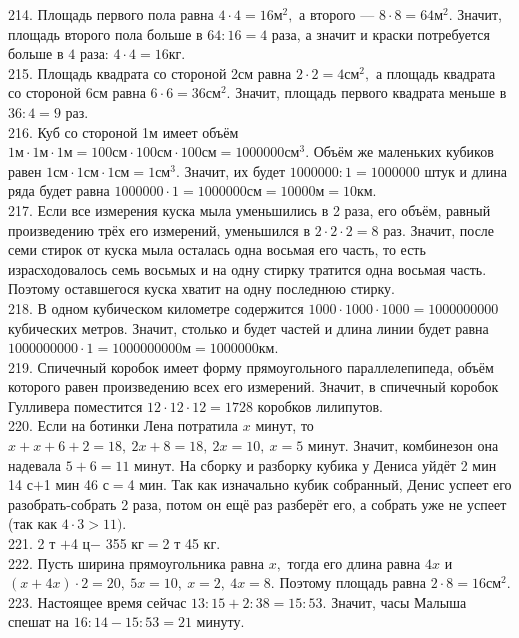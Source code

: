 \documentclass[12pt]{article}
\begin{document}
214. Площадь первого пола равна $4\cdot4=16\text{м}^2,$ а второго --- $8\cdot8=64\text{м}^2.$ Значит, площадь второго пола больше в $64:16=4$ раза, а значит и краски потребуется больше в $4$ раза: $4\cdot4=16$кг.\\
215. Площадь квадрата со стороной 2см равна $2\cdot2=4\text{см}^2,$ а площадь квадрата со стороной 6см равна $6\cdot6=36\text{см}^2.$ Значит, площадь первого квадрата меньше в $36:4=9$ раз.\\
216. Куб со стороной 1м имеет объём $1\text{м}\cdot1\text{м}\cdot1\text{м}=100\text{см}\cdot100\text{см}\cdot100\text{см}=1000000\text{см}^3.$ Объём же маленьких кубиков равен $1\text{см}\cdot1\text{см}\cdot1\text{см}=1\text{см}^3.$ Значит, их будет $1000000:1=1000000$ штук и длина ряда будет равна
$1000000\cdot1=1000000\text{см}=10000\text{м}=10$км.\\
217. Если все измерения куска мыла уменьшились в 2 раза, его объём, равный произведению трёх его измерений, уменьшился в $2\cdot2\cdot2=8$ раз. Значит, после семи стирок от куска мыла осталась одна восьмая его часть, то есть израсходовалось семь восьмых и на одну стирку тратится одна восьмая часть. Поэтому оставшегося куска хватит на одну последнюю стирку.\\
218. В одном кубическом километре содержится $1000\cdot1000\cdot1000=1000000000$ кубических метров. Значит, столько и будет частей и длина линии будет равна $1000000000\cdot1=1000000000$м$=1000000$км.\\
219. Спичечный коробок имеет форму прямоугольного параллелепипеда, объём которого равен произведению всех его измерений. Значит, в спичечный коробок Гулливера поместится $12\cdot12\cdot12=1728$ коробков лилипутов.\\
220. Если на ботинки Лена потратила $x$ минут, то  $x+x+6+2=18,\ 2x+8=18,\ 2x=10,\ x=5$ минут. Значит, комбинезон она надевала $5+6=11$ минут. На сборку и разборку кубика у Дениса уйдёт 2 мин 14 с$+$1 мин 46 с$=$4 мин. Так как изначально кубик собранный, Денис успеет его разобрать-собрать 2 раза, потом он ещё раз разберёт его, а собрать уже не успеет (так как $4\cdot3>11).$\\
221. 2 т $+$4 ц$-$ 355 кг$=$2 т 45 кг.\\
222. Пусть ширина прямоугольника равна $x,$ тогда его длина равна $4x$ и $(x+4x)\cdot2=20,\ 5x=10,\ x=2,\ 4x=8.$ Поэтому площадь равна $2\cdot8=16\text{см}^2.$\\
223. Настоящее время сейчас $13:15+2:38=15:53.$ Значит, часы Малыша спешат на $16:14-15:53=21$ минуту.\\
\end{document}
